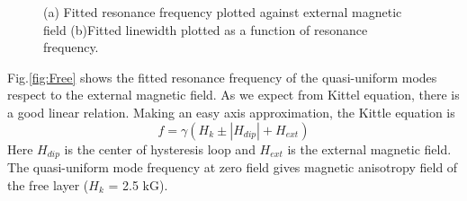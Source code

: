 \begin{figure}[!ht]
\centering
{}
\caption{(a) Fitted resonance frequency plotted against external magnetic field (b)Fitted linewidth plotted as a function of resonance frequency.}
\end{figure}

Fig.\ref{fig:Free} shows the fitted resonance frequency of the quasi-uniform modes respect to the external magnetic field. As we expect from Kittel equation, there is a good linear relation. Making an easy axis approximation, the Kittle equation is 
\begin{equation}
f = \gamma(H_{k} \pm |H_{dip}| + H_{ext})
\end{equation}
Here $H_{dip}$ is the center of hysteresis loop and $H_{ext}$ is the external magnetic field. The quasi-uniform mode frequency at zero field gives magnetic anisotropy field of the free layer ($H_{k}$ = 2.5 kG). 

